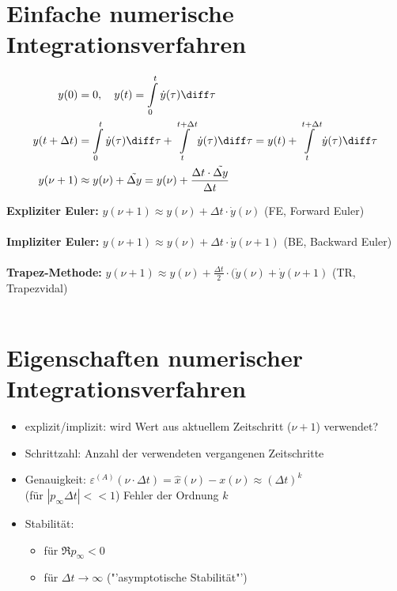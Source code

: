 \section{Einfache numerische Integrationsverfahren}
\begin{equation}
\begin{split}
y(0) &= 0,\quad y(t) = \int\limits_0^t \dot{y}(\tau) \diff \tau\\
y(t+ \Delta t) &= \int\limits_0^t \dot{y}(\tau) \diff \tau + \int\limits_t^{t+\Delta t} \dot{y}(\tau) \diff\tau = y(t) + \int\limits_t^{t+\Delta t} \dot{y}(\tau) \diff\tau\\
y(\nu +1) &\approx y(\nu) + \tilde{\Delta y} = y(\nu) + \frac{\Delta t \cdot \tilde{\Delta y}}{\Delta t}
\end{split}
\end{equation}

\textbf{Expliziter Euler: } $y(\nu +1) \approx y(\nu) + \Delta t \cdot \dot{y}(\nu)$ (FE, Forward Euler)\\
\\

\textbf{Impliziter Euler: } $y(\nu +1) \approx y(\nu) + \Delta t \cdot \dot{y}(\nu +1)$ (BE, Backward Euler)\\
\\

\textbf{Trapez-Methode: } $y(\nu +1) \approx y(\nu) + \frac{\Delta t}{2} \cdot (\dot{y}(\nu) + \dot{y}(\nu + 1)$ (TR, Trapezvidal)\\
\\

\section{Eigenschaften numerischer Integrationsverfahren}
\begin{itemize}
\item explizit/implizit: wird Wert aus aktuellem Zeitschritt ($\nu + 1$) verwendet?
\item Schrittzahl: Anzahl der verwendeten vergangenen Zeitschritte
\item Genauigkeit: $\varepsilon^{(A)}(\nu \cdot \Delta t) = \hat{x}(\nu) - x(\nu) \approx (\Delta t)^k$\\
(für $|p_\infty \Delta t| << 1$) \quad Fehler der Ordnung $k$
\item Stabilität: \begin{itemize}
\item für $\Re{p_\infty} < 0$
\item für $\Delta t \rightarrow \infty$ ("'asymptotische Stabilität"')
\end{itemize}
\end{itemize}

